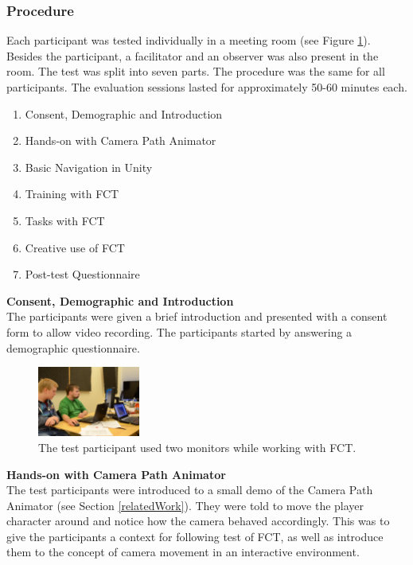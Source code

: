 \subsubsection{Procedure}
Each participant was tested individually in a meeting room (see Figure \ref{fig:tt}). Besides the participant, a facilitator and an observer was also present in the room. The test was split into seven parts. The procedure was the same for all participants. The evaluation sessions lasted for approximately 50-60 minutes each.

\begin{enumerate}
\item Consent, Demographic and Introduction
\item Hands-on with Camera Path Animator
\item Basic Navigation in Unity
\item Training with FCT
\item Tasks with FCT
\item Creative use of FCT
\item Post-test Questionnaire
\end{enumerate}

\textbf{Consent, Demographic and Introduction}\\
The participants were given a brief introduction and presented with a consent form to allow video recording. The participants started by answering a demographic questionnaire. 

\begin{figure}[htbp]
\centering
\includegraphics[width=0.3\textwidth]{Pics/test_setup}
\caption{The test participant used two monitors while working with FCT.}
\label{fig:tt}
\end{figure}

\textbf{Hands-on with Camera Path Animator}\\
The test participants were introduced to a small demo of the Camera Path Animator \cite{unity_camTool} (see Section \ref{relatedWork}). They were told to move the player character around and notice how the camera behaved accordingly. This was to give the participants a context for following test of FCT, as well as introduce them to the concept of camera movement in an interactive environment.

